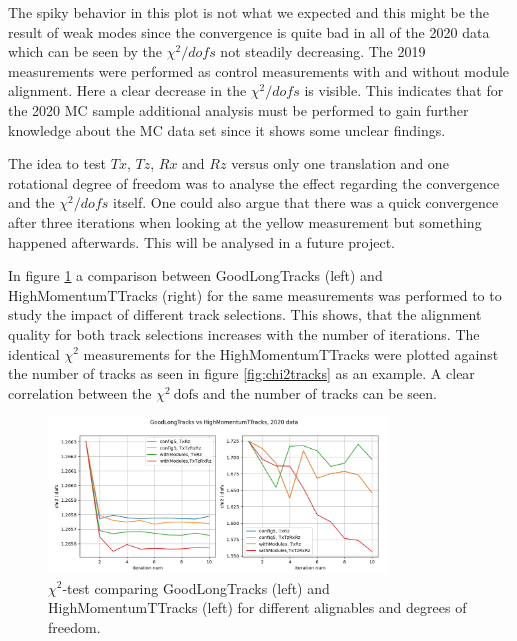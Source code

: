 The spiky behavior in this plot is not what we expected and this might be the result of weak modes since the convergence is quite bad in all of the 2020 data which can be seen by the $\chi^2 / dofs$ not steadily decreasing.
The 2019 measurements were performed as control measurements with and without
module alignment. Here a clear decrease in the $\chi^2 / dofs$ is visible. This
indicates that for the 2020 MC sample additional analysis must be performed to gain further knowledge about the MC data set since it shows some unclear findings.

The idea to test $Tx$, $Tz$, $Rx$ and $Rz$ versus only one translation and one
rotational degree of freedom was to analyse the effect regarding the convergence and the $\chi^2 / dofs$ itself. One could also argue that there was a quick convergence after three iterations when looking at the yellow measurement but something happened afterwards. This will be analysed in a future project.

In figure \ref{fig:chi2iter} a comparison between GoodLongTracks (left) and HighMomentumTTracks (right) for the same measurements was performed to to study the impact of different track selections. This shows, that the alignment quality for both track selections increases with the number of iterations.
The identical $\chi^2$ measurements for the HighMomentumTTracks were plotted against the number of tracks as seen in figure \ref{fig:chi2tracks} as an example.
A clear correlation between the $\chi^2 \ \text{dofs}$ and the number of tracks can be seen.

\begin{figure}
  \centering
  \includegraphics[width=0.8\textwidth]{plots/GL_HM_chi2_2020.png}
  \caption{$\chi^2$-test comparing GoodLongTracks (left) and HighMomentumTTracks (left) for different alignables and degrees of freedom.}
  \label{fig:chi2iter}
\end{figure}

